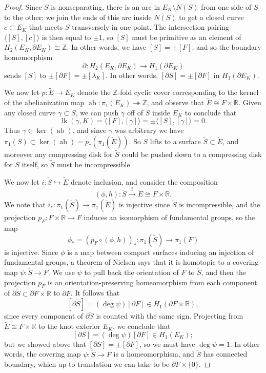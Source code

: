 \documentclass[11pt]{amsart}
\numberwithin{equation}{section}
\numberwithin{theorem}{section}
\theoremstyle{definition}
\newcommand{\Z}{\mathbb{Z}}
\newcommand{\R}{\mathbb{R}}
\newcommand{\ab}{\operatorname{ab}}
\begin{document}
\begin{proof}
Since $S$ is nonseparating, there is an arc in $E_K \setminus N(S)$ from one side of $S$ to the other; we join the ends of this arc inside $N(S)$ to get a closed curve $c \subset E_K$ that meets $S$ transversely in one point.  The intersection pairing $\langle [S], [c] \rangle$ is then equal to $\pm1$, so $[S]$ must be primitive as an element of $H_2(E_K,\partial E_K) \cong \Z$.  In other words, we have $[S] = \pm [F]$, and so the boundary homomorphism
\[ \partial: H_2(E_K, \partial E_K) \to H_1(\partial E_K) \]
sends $[S]$ to $\pm [\partial F] = \pm [\lambda_K]$.  In other words, $[\partial S] = \pm[\partial F]$ in $H_1(\partial E_K)$.

We now let $p: \tilde{E} \to E_K$ denote the $\Z$-fold cyclic cover corresponding to the kernel of the abelianization map $\ab: \pi_1(E_K) \twoheadrightarrow \Z$, and observe that $\tilde{E} \cong F \times \R$.  Given any closed curve $\gamma \subset S$, we can push $\gamma$ off of $S$ inside $E_K$ to conclude that
\[ \operatorname{lk}(\gamma,K) = \langle [F], [\gamma] \rangle = \pm \langle [S], [\gamma] \rangle = 0. \]
Thus $\gamma \in \ker(\ab)$, and since $\gamma$ was arbitrary we have $\pi_1(S) \subset \ker(\ab) = p_*(\pi_1(\tilde{E}))$.  So $S$ lifts to a surface $\tilde{S} \subset \tilde{E}$, and moreover any compressing disk for $\tilde{S}$ could be pushed down to a compressing disk for $S$ itself, so $\tilde{S}$ must be incompressible.

We now let $i: \tilde{S} \hookrightarrow \tilde{E}$ denote inclusion, and consider the composition
\[ (\phi,h): \tilde{S} \xrightarrow{i} \tilde{E} \cong F \times \R. \]
We note that $i_*: \pi_1(\tilde{S}) \to \pi_1(\tilde{E})$ is injective since $\tilde{S}$ is incompressible, and the projection $p_F: F\times\R \to F$ induces an isomorphism of fundamental groups, so the map
\[ \phi_* = (p_F \circ (\phi,h))_*: \pi_1(\tilde{S}) \to \pi_1(F) \]
is injective.  Since $\phi$ is a map between compact surfaces inducing an injection of fundamental groups, a theorem of Nielsen \cite{nielsen-surfaces} says that it is homotopic to a covering map $\psi: \tilde{S} \to F$.  We use $\psi$ to pull back the orientation of $F$ to $\tilde{S}$, and then the projection $p_F$ is an orientation-preserving homeomorphism from each component of $\partial \tilde{S} \subset \partial F \times \R$ to $\partial F$.  It follows that
\[ [\partial \tilde{S}] = (\deg \psi)[\partial F] \in H_1(\partial F \times \R), \]
since every component of $\partial \tilde{S}$ is counted with the same sign.  Projecting from $\tilde{E} \cong F\times \R$ to the knot exterior $E_K$, we conclude that
\[ [\partial S] = (\deg\psi) [\partial F] \in H_1(E_K); \]
but we showed above that $[\partial S] = \pm[\partial F]$, so we must have $\deg\psi = 1$.  In other words, the covering map $\psi: \tilde{S} \to F$ is a homeomorphism, and $\tilde{S}$ has connected boundary, which up to translation we can take to be $\partial F \times \{0\}$.


\end{proof}
\end{document}
